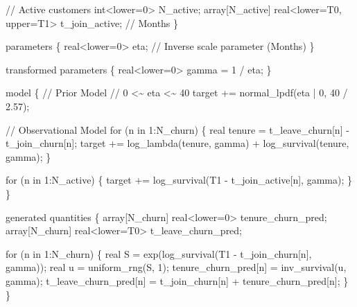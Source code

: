 \documentclass[
  letterpaper,
  DIV=11,
  numbers=noendperiod]{scrartcl}
\newenvironment{Shaded}{\begin{snugshade}}{\end{snugshade}}
\newcommand{\CommentTok}[1]{\textcolor[rgb]{0.37,0.37,0.37}{#1}}
\newcommand{\ControlFlowTok}[1]{\textcolor[rgb]{0.00,0.23,0.31}{#1}}
\newcommand{\DataTypeTok}[1]{\textcolor[rgb]{0.68,0.00,0.00}{#1}}
\newcommand{\DecValTok}[1]{\textcolor[rgb]{0.68,0.00,0.00}{#1}}
\newcommand{\FloatTok}[1]{\textcolor[rgb]{0.68,0.00,0.00}{#1}}
\newcommand{\KeywordTok}[1]{\textcolor[rgb]{0.00,0.23,0.31}{#1}}
\newcommand{\NormalTok}[1]{\textcolor[rgb]{0.00,0.23,0.31}{#1}}
\begin{document}
\begin{codelisting}
\begin{Shaded}
\begin{Highlighting}[]
  \CommentTok{// Active customers}
  \DataTypeTok{int}\NormalTok{\textless{}}\KeywordTok{lower}\NormalTok{=}\DecValTok{0}\NormalTok{\textgreater{} N\_active;}
  \DataTypeTok{array}\NormalTok{[N\_active] }\DataTypeTok{real}\NormalTok{\textless{}}\KeywordTok{lower}\NormalTok{=T0, }\KeywordTok{upper}\NormalTok{=T1\textgreater{} t\_join\_active; }\CommentTok{// Months}
\NormalTok{\}}

\KeywordTok{parameters}\NormalTok{ \{}
  \DataTypeTok{real}\NormalTok{\textless{}}\KeywordTok{lower}\NormalTok{=}\DecValTok{0}\NormalTok{\textgreater{} eta; }\CommentTok{// Inverse scale parameter (Months)}
\NormalTok{\}}

\KeywordTok{transformed parameters}\NormalTok{ \{}
  \DataTypeTok{real}\NormalTok{\textless{}}\KeywordTok{lower}\NormalTok{=}\DecValTok{0}\NormalTok{\textgreater{} gamma = }\DecValTok{1}\NormalTok{ / eta;}
\NormalTok{\}}

\KeywordTok{model}\NormalTok{ \{}
  \CommentTok{// Prior Model}
  \CommentTok{// 0 \textless{}\textasciitilde{} eta \textless{}\textasciitilde{} 40}
  \KeywordTok{target +=}\NormalTok{ normal\_lpdf(eta | }\DecValTok{0}\NormalTok{, }\DecValTok{40}\NormalTok{ / }\FloatTok{2.57}\NormalTok{);}

  \CommentTok{// Observational Model}
  \ControlFlowTok{for}\NormalTok{ (n }\ControlFlowTok{in} \DecValTok{1}\NormalTok{:N\_churn) \{}
    \DataTypeTok{real}\NormalTok{ tenure = t\_leave\_churn[n] {-} t\_join\_churn[n];}
    \KeywordTok{target +=}\NormalTok{   log\_lambda(tenure, gamma)}
\NormalTok{              + log\_survival(tenure, gamma);}
\NormalTok{  \}}

  \ControlFlowTok{for}\NormalTok{ (n }\ControlFlowTok{in} \DecValTok{1}\NormalTok{:N\_active) \{}
    \KeywordTok{target +=}\NormalTok{ log\_survival(T1 {-} t\_join\_active[n], gamma);}
\NormalTok{  \}}
\NormalTok{\}}

\KeywordTok{generated quantities}\NormalTok{ \{}
  \DataTypeTok{array}\NormalTok{[N\_churn] }\DataTypeTok{real}\NormalTok{\textless{}}\KeywordTok{lower}\NormalTok{=}\DecValTok{0}\NormalTok{\textgreater{} tenure\_churn\_pred;}
  \DataTypeTok{array}\NormalTok{[N\_churn] }\DataTypeTok{real}\NormalTok{\textless{}}\KeywordTok{lower}\NormalTok{=T0\textgreater{} t\_leave\_churn\_pred;}

  \ControlFlowTok{for}\NormalTok{ (n }\ControlFlowTok{in} \DecValTok{1}\NormalTok{:N\_churn) \{}
    \DataTypeTok{real}\NormalTok{ S = exp(log\_survival(T1 {-} t\_join\_churn[n], gamma));}
    \DataTypeTok{real}\NormalTok{ u = uniform\_rng(S, }\DecValTok{1}\NormalTok{);}
\NormalTok{    tenure\_churn\_pred[n]}
\NormalTok{      = inv\_survival(u, gamma);}
\NormalTok{    t\_leave\_churn\_pred[n]}
\NormalTok{      = t\_join\_churn[n] + tenure\_churn\_pred[n];}
\NormalTok{  \}}
\NormalTok{\}}
\end{Highlighting}
\end{Shaded}

\end{codelisting}
\end{document}
